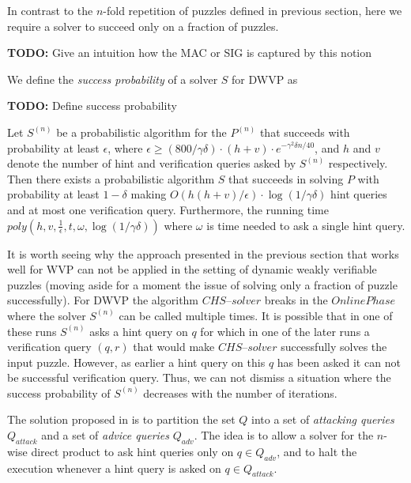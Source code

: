 In contrast to the $n$-fold repetition of puzzles defined in previous section, here we
require a solver to succeed only on a fraction of puzzles.

\begin{todo}
  \textbf{TODO:} Give an intuition how the MAC or SIG is captured by this notion
\end{todo}

We define the \textit{success probability} of a solver $S$ for DWVP as
\begin{todo}
  \textbf{TODO:} Define success probability
\end{todo}

\begin{theorem}
Let $S^{(n)}$ be a probabilistic algorithm for the $P^{(n)}$ that succeeds with
probability at least $\epsilon$, where $\epsilon \geq (800/\gamma\delta) \cdot (h+v) \cdot e^{-\gamma^2\delta n/40}$, and $h$ and $v$
denote the number of hint and verification queries asked by $S^{(n)}$ respectively.
Then there exists a probabilistic algorithm $S$ that succeeds in solving $P$ with probability at least
$1-\delta$ making $O(h(h+v)/\epsilon) \cdot \log(1/\gamma\delta)$ hint queries and at most one verification query.
Furthermore, the running time $\mathit{poly}(h,v,\frac{1}{\epsilon}, t, \omega, \log(1/\gamma\delta))$ where
$\omega$ is time needed to ask a single hint query.
\end{theorem}

It is worth seeing why the approach presented in the previous section that works well for WVP
can not be applied in the setting of dynamic weakly verifiable puzzles
(moving aside for a moment the issue of solving only a fraction of puzzle successfully).
For DWVP the algorithm $\mathit{CHS\text{--}solver}$ breaks in the $\mathit{OnlinePhase}$ where
the solver $S^{(n)}$ can be called multiple times.
It is possible that in one of these runs $S^{(n)}$ asks a hint query on $q$
for which in one of the later runs a verification query $(q,r)$
that would make $\mathit{CHS\text{--}solver}$ successfully solves the input puzzle.
However, as earlier a hint query on this $q$ has been asked it can not be successful verification query.
Thus, we can not dismiss a situation where the success probability of $S^{(n)}$ decreases with the number of iterations.

The solution proposed in \cite{Dodis:2009:SAI:1530441.1530450} is to partition the set $Q$ into a set of \textit{attacking queries} $Q_{\mathit{attack}}$
and a set of \textit{advice queries} $Q_{\mathit{adv}}$. The idea is to allow a solver for the $n$-wise direct product to ask hint
queries only on $q \in Q_{\mathit{adv}}$, and to halt the execution whenever a hint query is asked on $q \in Q_{\mathit{attack}}$.

